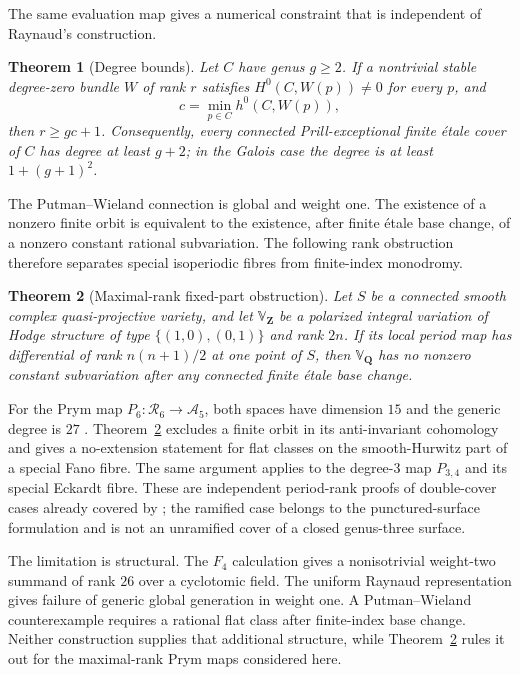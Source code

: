 \documentclass[11pt,reqno]{amsart}
\numberwithin{equation}{section}
\newtheorem{theorem}{Theorem}[section]
\theoremstyle{definition}
\theoremstyle{remark}
\newcommand{\Q}{\mathbf Q}
\newcommand{\Z}{\mathbf Z}
\newcommand{\cA}{\mathcal A}
\newcommand{\cR}{\mathcal R}
\begin{document}
The same evaluation map gives a numerical constraint that is independent of Raynaud's construction.

\begin{theorem}[Degree bounds]\label{thm:intro-degree}
Let $C$ have genus $g\ge2$.  If a nontrivial stable degree-zero bundle $W$ of rank $r$ satisfies $H^0(C,W(p))\ne0$ for every $p$, and
\[
c=\min_{p\in C}h^0(C,W(p)),
\]
then $r\ge gc+1$.  Consequently, every connected Prill-exceptional finite \'etale cover of $C$ has degree at least $g+2$; in the Galois case the degree is at least $1+(g+1)^2$.
\end{theorem}

The Putman--Wieland connection is global and weight one.  The existence of a nonzero finite orbit is equivalent to the existence, after finite \'etale base change, of a nonzero constant rational subvariation.  The following rank obstruction therefore separates special isoperiodic fibres from finite-index monodromy.

\begin{theorem}[Maximal-rank fixed-part obstruction]\label{thm:intro-fixed}
Let $S$ be a connected smooth complex quasi-projective variety, and let $\mathbb V_{\Z}$ be a polarized integral variation of Hodge structure of type $\{(1,0),(0,1)\}$ and rank $2n$.  If its local period map has differential of rank $n(n+1)/2$ at one point of $S$, then $\mathbb V_{\Q}$ has no nonzero constant subvariation after any connected finite \'etale base change.
\end{theorem}

For the Prym map $P_6:\cR_6\to\cA_5$, both spaces have dimension $15$ and the generic degree is $27$ \cite[Theorem~I.2.1]{DonagiSmith1981}.  Theorem~\ref{thm:intro-fixed} excludes a finite orbit in its anti-invariant cohomology and gives a no-extension statement for flat classes on the smooth-Hurwitz part of a special Fano fibre.  The same argument applies to the degree-$3$ map $P_{3,4}$ and its special Eckardt fibre.  These are independent period-rank proofs of double-cover cases already covered by \cite[Theorem~1.2]{LandesmanLitt2023}; the ramified case belongs to the punctured-surface formulation and is not an unramified cover of a closed genus-three surface.

The limitation is structural.  The $F_4$ calculation gives a nonisotrivial weight-two summand of rank $26$ over a cyclotomic field.  The uniform Raynaud representation gives failure of generic global generation in weight one.  A Putman--Wieland counterexample requires a rational flat class after finite-index base change.  Neither construction supplies that additional structure, while Theorem~\ref{thm:intro-fixed} rules it out for the maximal-rank Prym maps considered here.
\end{document}
